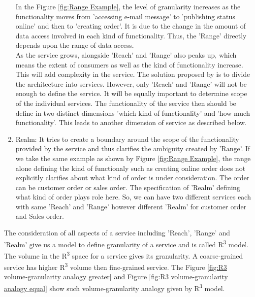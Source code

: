 \begin{enumerate}
In the Figure \ref{fig:Range Example}, the level of granularity increases as the functionality moves from 'accessing e-mail message' to 'publishing status online' and then to 'creating order'. It is due to the change in the amount of data access involved in each kind of functionality. Thus, the 'Range' directly depends upon the range of data access.
\\
As the service grows,  alongside 'Reach' and 'Range' also peaks up, which means the extent of consumers as well as the kind of functionality increase. This will add complexity in the service. The solution proposed by \cite{Cockburn:2001aa} is to divide the architecture into services. However, only 'Reach' and 'Range' will not be enough to define the service. It will be equally important to determine scope of the individual services. The functionality of the service then should be define in two distinct dimensions 'which kind of functionality' and 'how much functionality'. This leads to another dimension of service as described below.
\cite{Keen:2015aa, Weill:1998aa, Pierre-Reldin:2007aa}
\\
\item Realm: It tries to create a boundary around the scope of the functionality provided by the service and thus clarifies the ambiguity created by 'Range'. If we take the same example as shown by Figure \ref{fig:Range Example}, the range alone defining the kind of functionaly such as creating online order does not explicitly clarifies about what kind of order is under consideration. The order can be customer order or sales order. The specification of 'Realm' defining what kind of order plays role here. So, we can have two different services each with same 'Reach' and 'Range' however different 'Realm' for customer order and Sales order.  \cite{Keen:2015aa, Weill:1998aa, Pierre-Reldin:2007aa}
\end{enumerate}

The consideration of all aspects of a service including 'Reach', 'Range' and 'Realm' give us a model to define granularity of a service and is called R\textsuperscript{3} model. The volume in the R\textsuperscript{3} space for a service gives its granularity. A coarse-grained service has higher R\textsuperscript{3} volume then fine-grained service. The Figure \ref{fig:R3 volume-granularity analogy greater}  and Figure \ref{fig:R3 volume-granularity analogy equal} show such volume-granularity analogy given by R\textsuperscript{3} model. \cite{Keen:2015aa, Weill:1998aa, Pierre-Reldin:2007aa}

